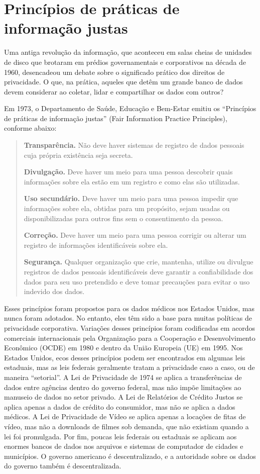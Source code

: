 \documentclass{book}
\begin{document}
\section{Princípios de práticas de informação justas}
\label{cap3:quem-principios}
Uma antiga revolução da informação, que aconteceu em salas cheias de
unidades de disco que brotaram em prédios governamentais e corporativos
na década de 1960, desencadeou um debate sobre o significado prático dos
direitos de privacidade. O que, na prática, aqueles que detêm um grande
banco de dados devem considerar ao coletar, lidar e compartilhar os dados
com outros?

Em 1973, o Departamento de Saúde, Educação e Bem-Estar emitiu os
``Princípios de práticas de informação justas'' (Fair
Information Practice Principles), conforme abaixo:

\begin{quote}
\textbf{Transparência.} Não deve haver sistemas de registro de dados pessoais
cuja própria existência seja secreta.

\textbf{Divulgação.} Deve haver um meio para uma pessoa descobrir quais
informações sobre ela estão em um registro e como elas são utilizadas.

\textbf{Uso secundário.} Deve haver um meio para uma pessoa impedir que
informações sobre ela, obtidas para um propósito, sejam usadas ou 
disponibilizadas para outros fins sem o consentimento da pessoa.

\textbf{Correção.} Deve haver um meio para uma pessoa corrigir ou alterar um
registro de informações identificáveis sobre ela.

\textbf{Segurança.} Qualquer organização que crie, mantenha, utilize ou divulgue
registros de dados pessoais identificáveis deve garantir a confiabilidade dos
dados para seu uso pretendido e deve tomar precauções para evitar o uso indevido
dos dados. 
\end{quote}

Esses princípios foram propostos para os dados médicos nos Estados Unidos, mas
nunca foram adotados. No entanto, eles têm sido a base para muitas políticas
de privacidade corporativa. Variações desses princípios foram codificadas em 
acordos comerciais internacionais pela Organização para a Cooperação e
Desenvolvimento Econômico (OCDE) em 1980 e dentro da União Europeia (UE) em 1995.
Nos Estados Unidos, ecos desses princípios podem ser encontrados em algumas leis
estaduais, mas as leis federais geralmente tratam a privacidade caso a caso,
ou de maneira ``setorial''. A Lei de Privacidade de 1974 se aplica a transferências
de dados entre agências dentro do governo federal, mas não impõe limitações ao
manuseio de dados no setor privado. A Lei de Relatórios de Crédito Justos se
aplica apenas a dados de crédito do consumidor, mas não se aplica a dados
médicos. A Lei de Privacidade de Vídeo se aplica apenas a locações de fitas de
vídeo, mas não a downloads de filmes sob demanda, que não existiam quando a lei
foi promulgada. Por fim, poucas leis federais ou estaduais se aplicam aos enormes
bancos de dados nos arquivos e sistemas de computador de cidades e municípios.
O governo americano é descentralizado, e a autoridade sobre os dados do governo
também é descentralizada.
\end{document}
